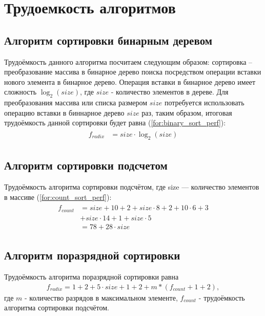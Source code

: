 \section{Трудоемкость алгоритмов}

\subsection{Алгоритм сортировки бинарным деревом}

Трудоёмкость данного алгоритма посчитаем следующим образом: сортировка -- преобразование массива в бинарное дерево поиска посредством операции вставки нового элемента в бинарное дерево.
Операция вставки в бинарное дерево имеет сложность $ \log_{2}(size)$, где $size$ - количество элементов в дереве.
Для преобразования массива или списка размером $size$ потребуется использовать операцию вставки в биннарное дерево $size$ раз, таким образом, итоговая трудоёмкость данной сортировки будет равна (\ref{for:binary_sort_perf}):
\begin{align}
	\begin{split}
		\label{for:binary_sort_perf}
		f_{radix} &= size \cdot \log_{2}(size)
	\end{split}
\end{align}


\subsection{Алгоритм сортировки подсчетом}

Трудоёмкость алгоритма сортировки подсчётом, где size --- количество элементов в массиве (\ref{for:count_sort_perf}):
\begin{align}
	\begin{split}
		\label{for:count_sort_perf}
		f_{count} &= size + 10  + 2 + size \cdot 8 + 2 + 10 \cdot 6 + 3 \\
		&+ size \cdot 14 + 1 + size \cdot 5 \\
		&= 78 + 28 \cdot size
	\end{split}
\end{align}

\subsection{Алгоритм поразрядной сортировки}

Трудоёмкость алгоритма поразрядной сортировки равна %
\begin{align}
	\label{for:radix_sort_perf}
	f_{radix} = 1 + 2 + 5 \cdot size + 1 + 2 + m * (f_{count} + 1 + 2),
\end{align}
где $m$ - количество разрядов в максимальном элементе, $f_{count}$ - трудоёмкость алгоритма сортировки подсчётом.

